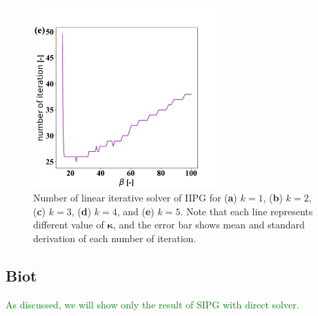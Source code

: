 \documentclass{article}
\newcommand{\meen}[1]{{\textcolor{green}{#1}}}
\begin{document}
\begin{figure}[h!]
        \includegraphics[width=7.0cm, height=7.0cm]{pictures/ell_homo_diff_k_iipg_it_k5.pdf}
   \caption{Number of linear iterative solver of IIPG for (\textbf{a}) $k=1$, (\textbf{b}) $k=2$, (\textbf{c}) $k=3$, (\textbf{d}) $k=4$, and (\textbf{e}) $k=5$. Note that each line represents different value of $\bm{\kappa}$, and the error bar shows mean and standard derivation of each number of iteration.}
   \label{fig:ell_homo_iipg_noi}
\end{figure}

\subsection{Biot}

\meen{As discussed, we will show only the result of SIPG with direct solver.}


\end{document}
